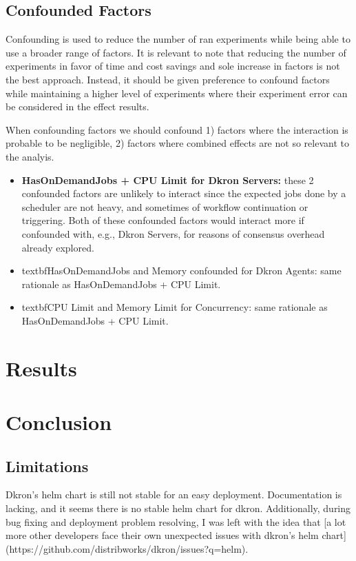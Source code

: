 \documentclass[runningheads]{llncs}
\begin{document}
\subsection{Confounded Factors}
Confounding is used to reduce the number of ran experiments while being able to use a broader range
of factors. It is relevant to note that reducing the number of experiments in favor of time and cost savings
and sole increase in factors is not the best approach. Instead, it should be given preference to confound
factors while maintaining a higher level of experiments where their experiment error can be considered
in the effect results.

When confounding factors we should confound 1) factors where the interaction is probable to be negligible,
2) factors where combined effects are not so relevant to the analyis.

\begin{itemize}
    \item \textbf{HasOnDemandJobs + CPU Limit for Dkron Servers:} these 2 confounded factors are unlikely to interact since the expected jobs done by
        a scheduler are not heavy, and sometimes of workflow continuation or triggering.
        Both of these confounded factors would interact more if confounded with, e.g., Dkron Servers,
        for reasons of consensus overhead already explored.
    \item textbf{HasOnDemandJobs and Memory confounded for Dkron Agents:} same rationale as
    HasOnDemandJobs + CPU Limit.
    \item textbf{CPU Limit and Memory Limit for Concurrency}: same rationale as HasOnDemandJobs
    + CPU Limit.
\end{itemize}


\section{Results}
\label{results}
\section{Conclusion}

\subsection{Limitations}
Dkron's helm chart is still not stable for an easy deployment. Documentation is lacking, and
it seems there is no stable helm chart for dkron. Additionally, during bug fixing and deployment
problem resolving, I was left with the idea that [a lot more other developers face their own
unexpected issues with dkron's helm chart](https://github.com/distribworks/dkron/issues?q=helm).
\end{document}
